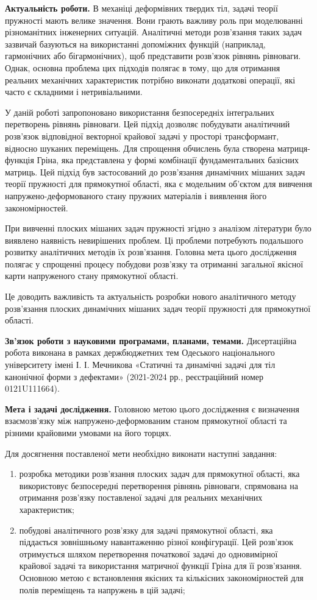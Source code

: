 \textbf{Актуальність роботи.} 
В механіці деформівних твердих тіл, задачі теорії пружності мають велике значення.
Вони грають важливу роль при моделюванні різноманітних інженерних ситуацій.
Аналітичні методи розв'язання таких задач зазвичай базуються на використанні допоміжних функцій
(наприклад, гармонічних або бігармонічних), щоб представити розв'язок рівнянь рівноваги.
Однак, основна проблема цих підходів полягає в тому, що для отримання реальних механічних характеристик
потрібно виконати додаткові операції, які часто є складними і нетривіальними.

У даній роботі запропоновано використання безпосередніх інтегральних перетворень рівнянь рівноваги.
Цей підхід дозволяє побудувати аналітичний розв'язок відповідної векторної крайової задачі у просторі трансформант,
відносно шуканих переміщень. Для спрощення обчислень була створена матриця-функція Гріна,
яка представлена у формі комбінації фундаментальних базісних матриць. Цей підхід був застосований до розв'язання динамічних мішаних задач теорії пружності для прямокутної області,
яка є модельним об'єктом для вивчення напружено-деформованого стану пружних матеріалів і виявлення його закономірностей.

При вивченні плоских мішаних задач пружності згідно з аналізом літератури було виявлено наявність невирішених проблем.
Ці проблеми потребують подальшого розвитку аналітичних методів їх розв'язання.
Головна мета цього дослідження полягає у спрощенні процесу побудови розв'язку та отриманні загальної якісної карти напруженого стану прямокутної області.

Це доводить важливість та актуальність розробки нового аналітичного методу розв'язання плоских динамічних мішаних задач теорії пружності для прямокутної області.

\textbf{Зв’язок роботи з науковими програмами, планами, темами.}
Дисертаційна робота виконана в рамках держбюджетних тем Одеського національного університету імені І. І. Мечникова
«Статичні та динамічні задачі для тіл канонічної форми з дефектами»
(2021-2024 рр., реєстраційний номер 0121U111664).

\textbf{Мета і задачі дослідження.}
Головною метою цього дослідження є визначення взаємозв'язку між напружено-деформованим станом прямокутної області та різними крайовими умовами на його торцях.

Для досягнення поставленої мети необхідно виконати наступні завдання:
\begin{enumerate}
    \item розробка методики розв'язання плоских задач для прямокутної області, яка використовує безпосередні перетворення рівнянь рівноваги,
    спрямована на отримання розв'язку поставленої задачі для реальних механічних характеристик;
    \item побудові аналітичного розв'язку для задачі прямокутної області, яка піддається зовнішньому навантаженню різної конфігурації.
    Цей розв'язок отримується шляхом перетворення початкової задачі до одновимірної крайової задачі та використання матричної функції Гріна для її розв'язання.
    Основною метою є встановлення якісних та кількісних закономірностей для полів переміщень та напружень в цій задачі;
\end{enumerate}

